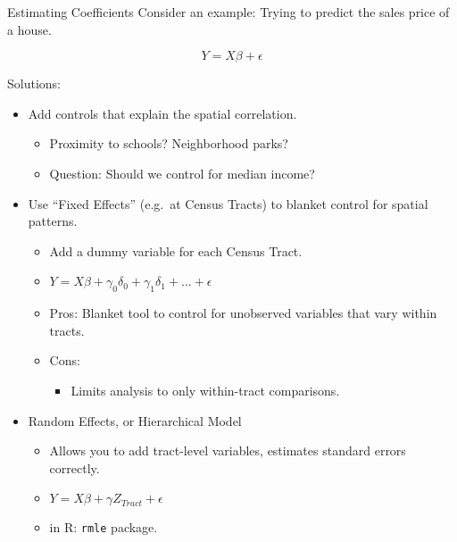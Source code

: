 \documentclass[
  8pt,
  ignorenonframetext,
]{beamer}
\providecommand{\tightlist}{%
  \setlength{\itemsep}{0pt}\setlength{\parskip}{0pt}}
\begin{document}
\begin{frame}[fragile]{Estimating Coefficients}
\protect\hypertarget{estimating-coefficients-1}{}
Consider an example: Trying to predict the sales price of a house.

\[Y = X\beta + \epsilon\]

Solutions:

\begin{itemize}
\tightlist
\item
  Add controls that explain the spatial correlation.

  \begin{itemize}
  \tightlist
  \item
    Proximity to schools? Neighborhood parks?
  \item
    Question: Should we control for median income? \pause
  \end{itemize}
\item
  Use ``Fixed Effects'' (e.g.~at Census Tracts) to blanket control for
  spatial patterns.

  \begin{itemize}
  \tightlist
  \item
    Add a dummy variable for each Census Tract.
  \item
    \(Y = X\beta + \gamma_0 \delta_0 + \gamma_1 \delta_1 + ... + \epsilon\)
  \item
    Pros: Blanket tool to control for unobserved variables that vary
    within tracts.
  \item
    Cons:

    \begin{itemize}
    \tightlist
    \item
      Limits analysis to only within-tract comparisons. \pause
    \end{itemize}
  \end{itemize}
\item
  Random Effects, or Hierarchical Model

  \begin{itemize}
  \tightlist
  \item
    Allows you to add tract-level variables, estimates standard errors
    correctly.
  \item
    \(Y = X\beta + \gamma Z_{Tract} + \epsilon\)
  \item
    in R: \texttt{rmle} package.
  \end{itemize}
\end{itemize}
\end{frame}
\end{document}
